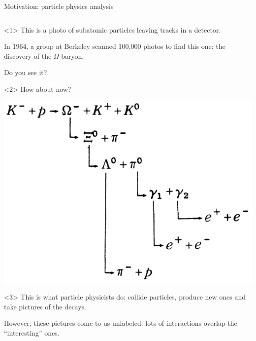 \documentclass[aspectratio=169]{beamer}
\begin{document}
\begin{frame}{Motivation: particle physics analysis}
\begin{columns}
\begin{center}
\begin{onlyenv}<1>
\vspace{-0.5 cm}
This is a photo of subatomic particles leaving tracks in a detector.

\vspace{0.5 cm}
In 1964, a group at Berkeley scanned 100,000 photos to find this one: the discovery of the $\Omega$ baryon.

\vspace{0.5 cm}
Do you see it?
\end{onlyenv}\begin{onlyenv}<2>
\vspace{-0.5 cm}
How about now?

\vspace{0.5 cm}
\includegraphics[width=\linewidth]{decay-chain.png}

\end{onlyenv}\begin{onlyenv}<3>
This is what particle physicists do: collide particles, produce new ones and take pictures of the decays.

\vspace{1 cm}
However, these pictures come to us unlabeled: lots of interactions overlap the ``interesting'' ones.

\vspace{1 cm}
\end{onlyenv}
\end{center}

\end{columns}
\end{frame}
\end{document}
